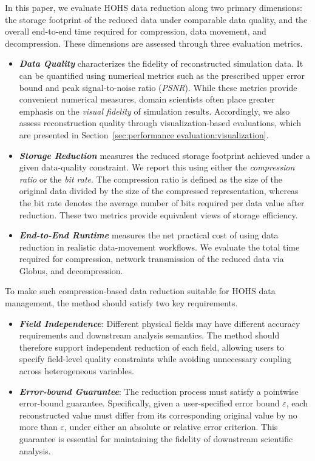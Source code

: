 In this paper, we evaluate HOHS data reduction along two primary dimensions: the storage footprint of the reduced data under comparable data quality, and the overall end-to-end time required for compression, data movement, and decompression. These dimensions are assessed through three evaluation metrics.
\begin{itemize}
    \item \textbf{\textit{Data Quality}} characterizes the fidelity of reconstructed simulation data. It can be quantified using numerical metrics such as the prescribed upper error bound and peak signal-to-noise ratio (\textit{PSNR}). While these metrics provide convenient numerical measures, domain scientists often place greater emphasis on the \textit{visual fidelity} of simulation results. Accordingly, we also assess reconstruction quality through visualization-based evaluations, which are presented in Section~\ref{sec:performance evaluation:visualization}.
    \item \textbf{\textit{Storage Reduction}} measures the reduced storage footprint achieved under a given data-quality constraint. We report this using either the \textit{compression ratio} or the \textit{bit rate}. The compression ratio is defined as the size of the original data divided by the size of the compressed representation, whereas the bit rate denotes the average number of bits required per data value after reduction. These two metrics provide equivalent views of storage efficiency.
    \item \textbf{\textit{End-to-End Runtime}} measures the net practical cost of using data reduction in realistic data-movement workflows. We evaluate the total time required for compression, network transmission of the reduced data via Globus, and decompression.
\end{itemize}

To make such compression-based data reduction suitable for HOHS data management, the method should satisfy two key requirements.
\begin{itemize}
    \item \textbf{\textit{Field Independence}}: Different physical fields may have different accuracy requirements and downstream analysis semantics. The method should therefore support independent reduction of each field, allowing users to specify field-level quality constraints while avoiding unnecessary coupling across heterogeneous variables.
    \item \textbf{\textit{Error-bound Guarantee}}: The reduction process must satisfy a pointwise error-bound guarantee. Specifically, given a user-specified error bound $\varepsilon$, each reconstructed value must differ from its corresponding original value by no more than $\varepsilon$, under either an absolute or relative error criterion. This guarantee is essential for maintaining the fidelity of downstream scientific analysis.
\end{itemize}